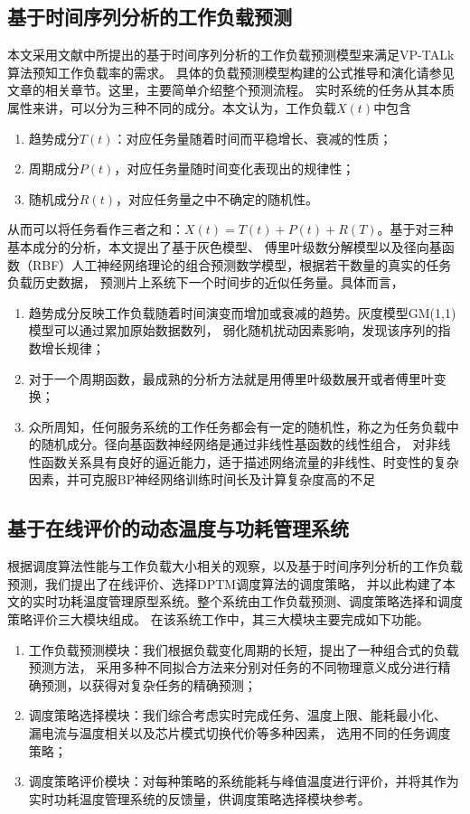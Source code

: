 \subsection{基于时间序列分析的工作负载预测}
本文采用文献中所提出的基于时间序列分析的工作负载预测模型来满足VP-TALk算法预知工作负载率的需求。 具体的负载预测模型构建的公式推导和演化请参见文章的相关章节。这里，主要简单介绍整个预测流程。
实时系统的任务从其本质属性来讲，可以分为三种不同的成分。本文认为，工作负载$X(t)$中包含
\begin{enumerate}[1)]
\item 趋势成分$T(t)$：对应任务量随着时间而平稳增长、衰减的性质；
\item 周期成分$P(t)$，对应任务量随时间变化表现出的规律性；
\item 随机成分$R(t)$，对应任务量之中不确定的随机性。
\end{enumerate}
从而可以将任务看作三者之和：$X(t)=T(t)+P(t)+R(T)$。基于对三种基本成分的分析，本文提出了基于灰色模型、 傅里叶级数分解模型以及径向基函数（RBF）人工神经网络理论的组合预测数学模型，根据若干数量的真实的任务负载历史数据， 预测片上系统下一个时间步的近似任务量。具体而言，
\begin{enumerate}[1)]
\item 趋势成分反映工作负载随着时间演变而增加或衰减的趋势。灰度模型GM(1,1)模型可以通过累加原始数据数列， 弱化随机扰动因素影响，发现该序列的指数增长规律；
\item 对于一个周期函数，最成熟的分析方法就是用傅里叶级数展开或者傅里叶变换；
\item 众所周知，任何服务系统的工作任务都会有一定的随机性，称之为任务负载中的随机成分。径向基函数神经网络是通过非线性基函数的线性组合， 对非线性函数关系具有良好的逼近能力，适于描述网络流量的非线性、时变性的复杂因素，并可克服BP神经网络训练时间长及计算复杂度高的不足
\end{enumerate}

\subsection{基于在线评价的动态温度与功耗管理系统}
根据调度算法性能与工作负载大小相关的观察，以及基于时间序列分析的工作负载预测，我们提出了在线评价、选择DPTM调度算法的调度策略， 并以此构建了本文的实时功耗温度管理原型系统。整个系统由工作负载预测、调度策略选择和调度策略评价三大模块组成。
在该系统工作中，其三大模块主要完成如下功能。
\begin{enumerate}[1)]
\item 工作负载预测模块：我们根据负载变化周期的长短，提出了一种组合式的负载预测方法， 采用多种不同拟合方法来分别对任务的不同物理意义成分进行精确预测，以获得对复杂任务的精确预测；
\item 调度策略选择模块：我们综合考虑实时完成任务、温度上限、能耗最小化、 漏电流与温度相关以及芯片模式切换代价等多种因素， 选用不同的任务调度策略；
\item 调度策略评价模块：对每种策略的系统能耗与峰值温度进行评价，并将其作为实时功耗温度管理系统的反馈量，供调度策略选择模块参考。
\end{enumerate}

